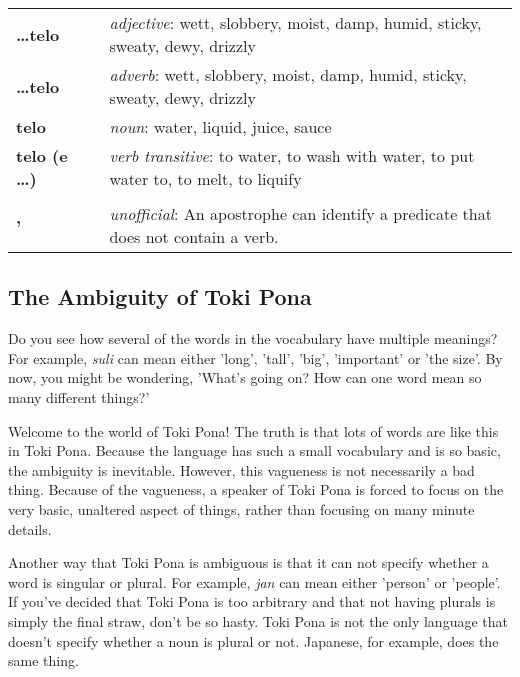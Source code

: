 \begin{supertabular}{p{2,5cm}|ll}
    \textbf{\dots telo}     &  & \textit{adjective}: wett, slobbery, moist, damp, humid, sticky, sweaty, dewy, drizzly                   \\
    \textbf{\dots telo}     &  & \textit{adverb}: wett, slobbery, moist, damp, humid, sticky, sweaty, dewy, drizzly                      \\
    \textbf{telo}           &  & \textit{noun}: water, liquid, juice, sauce                                                              \\
    \textbf{telo (e \dots)} &  & \textit{verb transitive}: to water, to wash with water, to put water to, to melt, to liquify            \\
                            &  &                                                                                                         \\
    \textbf{'}              &  & \textit{unofficial}: An apostrophe can identify a predicate that does not contain a verb.               \\
\end{supertabular}

\newpage

\subsection*{The Ambiguity of Toki Pona}
Do you see how several of the words in the vocabulary have multiple meanings?
For example, \textit{suli} can mean either 'long', 'tall', 'big', 'important' or 'the size'.
By now, you might be wondering, 'What's going on? How can one word mean so many different things?'

Welcome to the world of Toki Pona! The truth is that lots of words are like this in Toki Pona.
Because the language has such a small vocabulary and is so basic, the ambiguity is inevitable.
However, this vagueness is not necessarily a bad thing. Because of the vagueness, a speaker of Toki Pona is forced to focus on the very basic, unaltered aspect of things, rather than focusing on many minute details.

Another way that Toki Pona is ambiguous is that it can not specify whether a word is singular or plural.
For example, \textit{jan} can mean either 'person' or 'people'.
If you've decided that Toki Pona is too arbitrary and that not having plurals is simply the final straw, don't be so hasty.
Toki Pona is not the only language that doesn't specify whether a noun is plural or not.
Japanese, for example, does the same thing.


